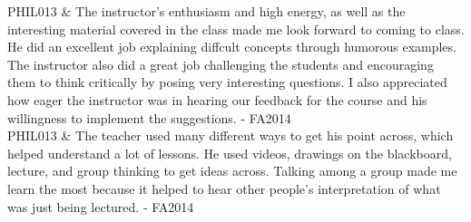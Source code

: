 \documentclass[p1noheader, 11pt]{../lightcv}
\begin{document}
\begin{dated}
    PHIL013 & The instructor’s enthusiasm and high energy, as well as the interesting material covered in the class made me look forward to coming to class. He did an excellent job explaining diffcult concepts through humorous examples. The instructor also did a great job challenging the students and encouraging them to think critically
    by posing very interesting questions. I also appreciated how eager the instructor was in hearing our feedback for the course and his willingness to implement the suggestions. - FA2014\\
    PHIL013 & The teacher used many different ways to get his point across, which helped understand a lot of lessons. He used videos, drawings on the blackboard, lecture, and group thinking to get ideas across. Talking among a group made me learn the most because it helped to hear other people’s interpretation of what was just being lectured. - FA2014\\


\end{dated}
\end{document}
